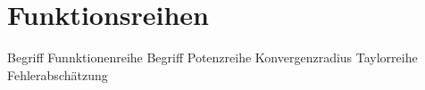 \chapter{Funktionsreihen}

Begriff Funnktionenreihe
Begriff Potenzreihe
Konvergenzradius
Taylorreihe
Fehlerabschätzung
